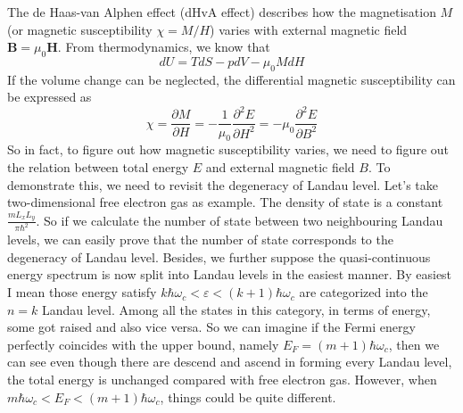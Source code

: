 \documentclass{article}
\begin{document}
The de Haas-van Alphen effect (dHvA effect) describes how the magnetisation $M$ (or magnetic susceptibility $\chi=M/H$) varies with external magnetic field $\mathbf{B}=\mu_0\mathbf{H}$. From thermodynamics, we know that\begin{equation}
    dU=TdS-pdV-\mu_0MdH
\end{equation}If the volume change can be neglected, the differential magnetic susceptibility can be expressed as\begin{equation}
    \chi=\frac{\partial{M}}{\partial{H}}=-\frac{1}{\mu_0}\frac{\partial^2E}{\partial{H}^2}=-\mu_0\frac{\partial^2E}{\partial{B}^2}
\end{equation}So in fact, to figure out how magnetic susceptibility varies, we need to figure out the relation between total energy $E$ and external magnetic field $B$. To demonstrate this, we need to revisit the degeneracy of Landau level. Let's take two-dimensional free electron gas as example. The density of state is a constant $\frac{mL_xL_y}{\pi\hbar^2}$. So if we calculate the number of state between two neighbouring Landau levels, we can easily prove that the number of state corresponds to the degeneracy of Landau level. Besides, we further suppose the quasi-continuous energy spectrum is now split into Landau levels in the easiest manner. By easiest I mean those energy satisfy $k\hbar\omega_c<\varepsilon<(k+1)\hbar\omega_c$ are categorized into the $n=k$ Landau level. Among all the states in this category, in terms of energy, some got raised and also vice versa. So we can imagine if the Fermi energy perfectly coincides with the upper bound, namely $E_F=(m+1)\hbar\omega_c$, then we can see even though there are descend and ascend in forming every Landau level, the total energy is unchanged compared with free electron gas. However, when $m\hbar\omega_c<E_F<(m+1)\hbar\omega_c$, things could be quite different.\\
\\
\end{document}
